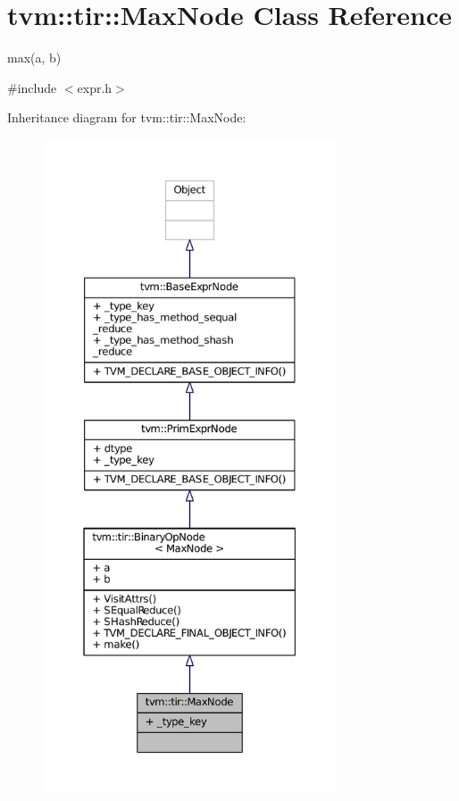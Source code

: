 \hypertarget{classtvm_1_1tir_1_1MaxNode}{}\section{tvm\+:\+:tir\+:\+:Max\+Node Class Reference}
\label{classtvm_1_1tir_1_1MaxNode}


max(a, b)  




{\ttfamily \#include $<$expr.\+h$>$}



Inheritance diagram for tvm\+:\+:tir\+:\+:Max\+Node\+:
\nopagebreak
\begin{figure}[H]
\begin{center}
\leavevmode
\includegraphics[height=550pt]{classtvm_1_1tir_1_1MaxNode__inherit__graph}
\end{center}
\end{figure}


